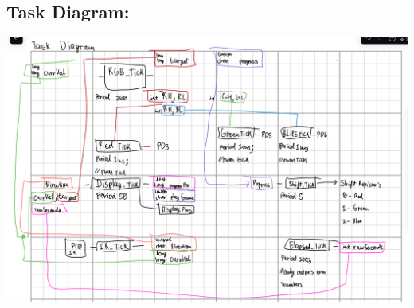 \documentclass[12pt]{article}
\begin{document}
\subsection*{Task Diagram:}
\includegraphics[width=\textwidth]{taskDiagram.png}

\pagebreak
\end{document}
